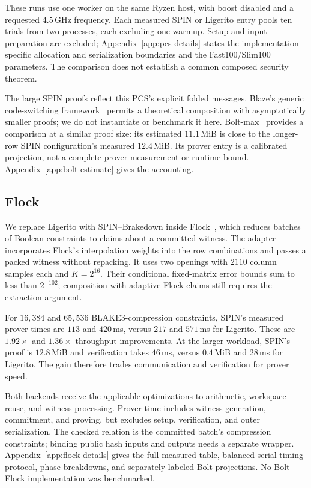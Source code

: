 These runs use one worker on the same Ryzen host, with boost disabled
and a requested $4.5$\,GHz frequency. Each measured SPIN or Ligerito entry pools ten trials from
two processes, each excluding one warmup. Setup and input preparation
are excluded; Appendix~\ref{app:pcs-details} states the implementation-specific
allocation and serialization boundaries and the Fast100/Slim100 parameters.
The comparison does not establish a common composed security theorem.

The large SPIN proofs reflect this PCS's explicit folded messages.
Blaze's generic code-switching framework~\cite{blaze25} permits a theoretical
composition with asymptotically smaller proofs; we do not instantiate or
benchmark it here. Bolt-max~\cite{bolt26} provides a comparison at a
similar proof size: its estimated $11.1$\,MiB is close to the longer-row
SPIN configuration's measured $12.4$\,MiB. Its prover entry is a calibrated
projection, not a complete prover measurement or runtime bound.
Appendix~\ref{app:bolt-estimate} gives the accounting.

\subsection{Flock}
\label{sec:spin-flock}

We replace Ligerito with SPIN--Brakedown inside Flock~\cite{flock26},
which reduces batches of Boolean constraints to claims about a committed
witness. The adapter incorporates Flock's interpolation weights into the
row combinations and passes a packed witness without repacking.
It uses two openings with $2110$ column samples each and $K=2^{16}$.
Their conditional fixed-matrix error bounds sum to less than $2^{-102}$;
composition with adaptive Flock claims still requires the extraction argument.

For $16{,}384$ and $65{,}536$ BLAKE3-compression constraints, SPIN's measured
prover times are $113$ and $420$\,ms, versus $217$ and $571$\,ms for Ligerito.
These are $1.92\times$ and $1.36\times$ throughput improvements.
At the larger workload, SPIN's proof is $12.8$\,MiB and verification takes
$46$\,ms, versus $0.4$\,MiB and $28$\,ms for Ligerito.
The gain therefore trades communication and verification for prover speed.

Both backends receive the applicable optimizations to arithmetic,
workspace reuse, and witness processing. Prover time includes witness generation,
commitment, and proving, but excludes setup, verification, and outer
serialization.
The checked relation is the committed batch's compression constraints;
binding public hash inputs and outputs needs a separate wrapper.
Appendix~\ref{app:flock-details} gives the full measured table, balanced
serial timing protocol, phase breakdowns, and separately labeled Bolt
projections. No Bolt--Flock implementation was benchmarked.
\FloatBarrier
